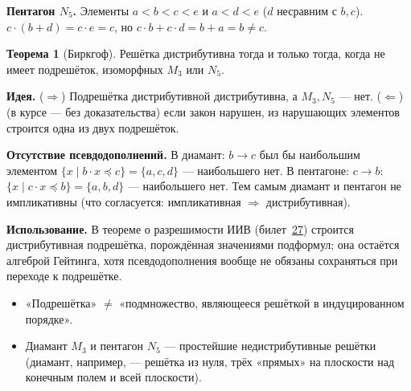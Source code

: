 \documentclass[11pt,a4paper]{article}
\theoremstyle{definition}
\newtheorem*{thm}{Теорема}
\begin{document}
\textbf{Пентагон $N_5$.} Элементы $a<b<c<e$ и $a<d<e$ ($d$ несравним с $b,c$). $c\cdot(b+d)=c\cdot e=c$, но $c\cdot b+c\cdot d=b+a=b\ne c$.

\begin{center}
\end{center}

\begin{thm}[Биркгоф]
Решётка дистрибутивна тогда и только тогда, когда не имеет подрешёток, изоморфных $M_3$ или $N_5$.
\end{thm}
\textbf{Идея.} ($\Rightarrow$) Подрешётка дистрибутивной дистрибутивна, а $M_3,N_5$ --- нет. ($\Leftarrow$) (в курсе --- без доказательства) если закон нарушен, из нарушающих элементов строится одна из двух подрешёток.

\textbf{Отсутствие псевдодополнений.} В диамант: $b\to c$ был бы наибольшим элементом $\{x\mid b\cdot x\preceq c\}=\{a,c,d\}$ --- наибольшего нет. В пентагоне: $c\to b$: $\{x\mid c\cdot x\preceq b\}=\{a,b,d\}$ --- наибольшего нет. Тем самым диамант и пентагон не импликативны (что согласуется: импликативная $\Rightarrow$ дистрибутивная).

\textbf{Использование.} В теореме о разрешимости ИИВ (билет~\hyperref[T:27]{27}) строится дистрибутивная подрешётка, порождённая значениями подформул; она остаётся алгеброй Гейтинга, хотя псевдодополнения вообще не обязаны сохраняться при переходе к подрешётке.

\begin{warn}
\begin{itemize}
\item «Подрешётка» $\ne$ «подмножество, являющееся решёткой в индуцированном порядке».
\item Диамант $M_3$ и пентагон $N_5$ --- простейшие недистрибутивные решётки (диамант, например, --- решётка из нуля, трёх «прямых» на плоскости над конечным полем и всей плоскости).
\end{itemize}
\end{warn}
\end{document}
